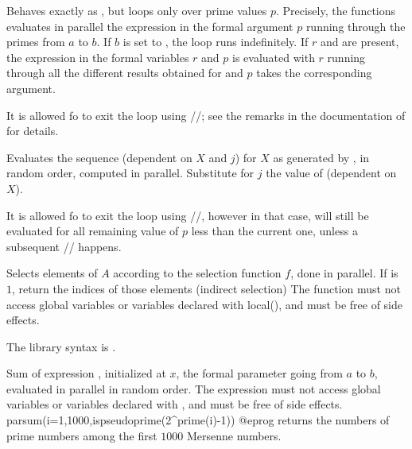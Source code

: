 {%

\label{se:parforprime}
Behaves exactly as , but loops only over prime values $p$.
Precisely, the functions evaluates in parallel the expression 
in the formal
argument $p$ running through the primes from $a$ to $b$.
If $b$ is set to , the loop runs indefinitely.
If $r$ and  are present, the expression  in the
formal variables $r$ and $p$ is evaluated with $r$ running through all
the different results obtained for  and $p$ takes the
corresponding argument.

It is allowed fo  to exit the loop using
//; see the remarks in the documentation
of  for details.


\label{se:parforvec}
Evaluates the sequence  (dependent on $X$ and $j$) for $X$
as generated by , in random order, computed in parallel. Substitute
for $j$ the value of  (dependent on $X$).

It is allowed fo  to exit the loop using
//, however in that case,  will
still be evaluated for all remaining value of $p$ less than the current one,
unless a subsequent // happens.

\label{se:parselect}
Selects elements of $A$ according to the selection function $f$, done in
parallel.  If \fl is $1$, return the indices of those elements (indirect
selection) The function  must not access global variables or
variables declared with local(), and must be free of side effects.

The library syntax is .

\label{se:parsum}
Sum of expression , initialized at $x$, the formal parameter
going from $a$ to $b$, evaluated in parallel in random order.
The expression  must not access global variables or
variables declared with , and must be free of side effects.
\bprog
parsum(i=1,1000,ispseudoprime(2^prime(i)-1))
@eprog
returns the numbers of prime numbers among the first $1000$ Mersenne numbers.

}
